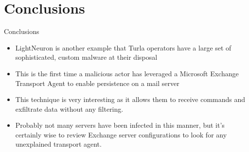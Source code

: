 \section{Conclusions}

\begin{frame}[fragile]{Conclusions}
    \begin{itemize}
        \item LightNeuron is another example that Turla operators
        have a large set of sophisticated, custom malware at their disposal
        \item This is the first time a malicious actor has leveraged a Microsoft Exchange Transport
        Agent to enable persistence on a mail server
        \item This technique is very interesting as it allows them to receive
        commands and exfiltrate data without any filtering.
        \item Probably not many servers have been infected in this manner, but it’s certainly wise to review Exchange server configurations to look for any unexplained transport agent.
    \end{itemize}
\end{frame}
